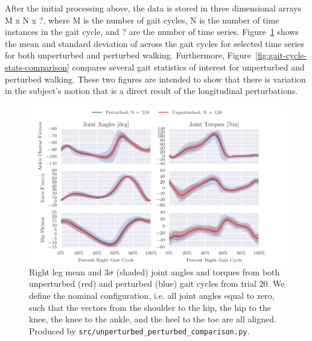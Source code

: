 \documentclass{article}
\begin{document}
After the initial processing above, the data is stored in three dimensional
arrays M x N x ?, where M is the number of gait cycles, N is the number of time
instances in the gait cycle, and ? are the number of time series.
Figure~\ref{fig:angle-torque-comparison} shows the mean and standard deviation
of across the gait cycles for selected time series for both unperturbed and
perturbed walking. Furthermore, Figure~\ref{fig:gait-cycle-stats-comparison}
compares several gait statistics of interest for unperturbed and perturbed
walking. These two figures are intended to show that there is variation in the
subject's motion that is a direct result of the longitudinal perturbations.
%
\begin{figure}
  \centering
  \includegraphics{figures/unperturbed-perturbed-comparison.pdf}
  \cprotect\caption{Right leg mean and $3\sigma$ (shaded) joint angles and
    torques from both unperturbed (red) and perturbed (blue) gait cycles
    from trial 20. We define the nominal configuration, i.e. all joint angles
    equal to zero, such that the vectors from the shoulder to the hip, the hip
    to the knee, the knee to the ankle, and the heel to the toe are all aligned.
    Produced by \verb|src/unperturbed_perturbed_comparison.py|.}
  \label{fig:angle-torque-comparison}
\end{figure}
%
\end{document}
